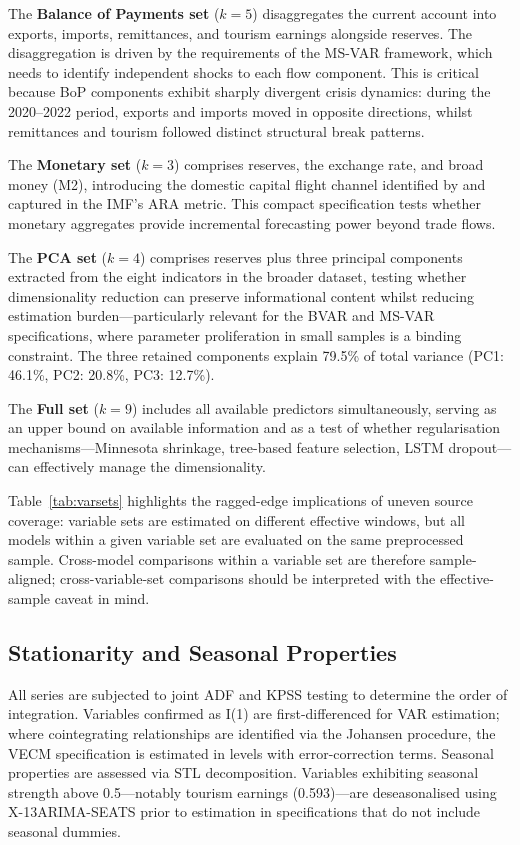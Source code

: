 \documentclass[12pt,a4paper]{article}
\begin{document}
The \textbf{Balance of Payments set} ($k=5$) disaggregates the current account into exports, imports, remittances, and tourism earnings alongside reserves. The disaggregation is driven by the requirements of the MS-VAR framework, which needs to identify independent shocks to each flow component. This is critical because BoP components exhibit sharply divergent crisis dynamics: during the 2020--2022 period, exports and imports moved in opposite directions, whilst remittances and tourism followed distinct structural break patterns.

The \textbf{Monetary set} ($k=3$) comprises reserves, the exchange rate, and broad money (M2), introducing the domestic capital flight channel identified by \cite{Obstfeld2010} and captured in the IMF's ARA metric. This compact specification tests whether monetary aggregates provide incremental forecasting power beyond trade flows.

The \textbf{PCA set} ($k=4$) comprises reserves plus three principal components extracted from the eight indicators in the broader dataset, testing whether dimensionality reduction can preserve informational content whilst reducing estimation burden---particularly relevant for the BVAR and MS-VAR specifications, where parameter proliferation in small samples is a binding constraint. The three retained components explain 79.5\% of total variance (PC1: 46.1\%, PC2: 20.8\%, PC3: 12.7\%).

The \textbf{Full set} ($k=9$) includes all available predictors simultaneously, serving as an upper bound on available information and as a test of whether regularisation mechanisms---Minnesota shrinkage, tree-based feature selection, LSTM dropout---can effectively manage the dimensionality.

Table~\ref{tab:varsets} highlights the ragged-edge implications of uneven source coverage: variable sets are estimated on different effective windows, but all models within a given variable set are evaluated on the same preprocessed sample. Cross-model comparisons within a variable set are therefore sample-aligned; cross-variable-set comparisons should be interpreted with the effective-sample caveat in mind.

\subsection{Stationarity and Seasonal Properties}

All series are subjected to joint ADF and KPSS testing to determine the order of integration. Variables confirmed as I(1) are first-differenced for VAR estimation; where cointegrating relationships are identified via the Johansen procedure, the VECM specification is estimated in levels with error-correction terms. Seasonal properties are assessed via STL decomposition. Variables exhibiting seasonal strength above 0.5---notably tourism earnings (0.593)---are deseasonalised using X-13ARIMA-SEATS prior to estimation in specifications that do not include seasonal dummies.
\end{document}
